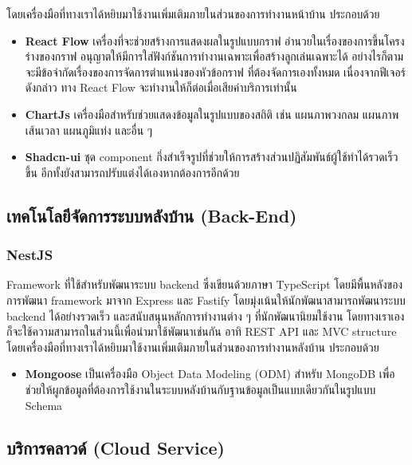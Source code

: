 โดยเครื่องมือที่ทางเราได้หยิบมาใช้งานเพิ่มเติมภายในส่วนของการทำงานหน้าบ้าน ประกอบด้วย
\begin{itemize}
      \item \textbf{React Flow}\label{subsec:reactflow} เครื่องที่จะช่วยสร้างการแสดงผลในรูปแบบกราฟ อำนวยในเรื่องของการขึ้นโครงร่างของกราฟ อนุญาตให้มีการใส่ฟังก์ชันการทำงานเฉพาะเพื่อสร้างลูกเล่นเฉพาะได้ อย่างไรก็ตาม จะมีข้อจำกัดเรื่องของการจัดการตำแหน่งของหัวข้อกราฟ ที่ต้องจัดการเองทั้งหมด เนื่องจากฟีเจอร์ดังกล่าว ทาง React Flow จะทำงานให้ก็ต่อเมื่อเสียค่าบริการเท่านั้น
      \item \textbf{ChartJs} เครื่องมือสำหรับช่วยแสดงข้อมูลในรูปแบบของสถิติ เช่น แผนภาพวงกลม แผนภาพเส้นเวลา แผนภูมิแท่ง และอื่น ๆ
      \item \textbf{Shadcn-ui} ชุด component กึ่งสำเร็จรูปที่ช่วยให้การสร้างส่วนปฏิสัมพันธ์ผู้ใช้ทำได้รวดเร็วขึ้น อีกทั้งยังสามารถปรับแต่งได้เองหากต้องการอีกด้วย
\end{itemize}

\subsection{เทคโนโลยีจัดการระบบหลังบ้าน (Back-End)}
\subsubsection{NestJS}
Framework ที่ใช้สำหรับพัฒนาระบบ backend ซึ่งเขียนด้วยภาษา TypeScript
โดยมีพื้นหลังของการพัฒนา framework มาจาก Express และ Fastify
โดยมุ่งเน้นให้นักพัฒนาสามารถพัฒนาระบบ backend ได้อย่างรวดเร็ว
และสนับสนุนหลักการทำงานต่าง ๆ ที่นักพัฒนานิยมใช้งาน
โดยทางเราเองก็จะใช้ความสามารถในส่วนนี้เพื่อนำมาใช้พัฒนาเช่นกัน อาทิ REST API
และ MVC structure
โดยเครื่องมือที่ทางเราได้หยิบมาใช้งานเพิ่มเติมภายในส่วนของการทำงานหลังบ้าน ประกอบด้วย
\begin{itemize}
      \item \textbf{Mongoose} เป็นเครื่องมือ Object Data Modeling (ODM) สำหรับ MongoDB เพื่อช่วยให้ผูกข้อมูลที่ต้องการใช้งานในระบบหลังบ้านกับฐานข้อมูลเป็นแบบเดียวกันในรูปแบบ Schema
\end{itemize}

\subsection{บริการคลาวด์ (Cloud Service)}
